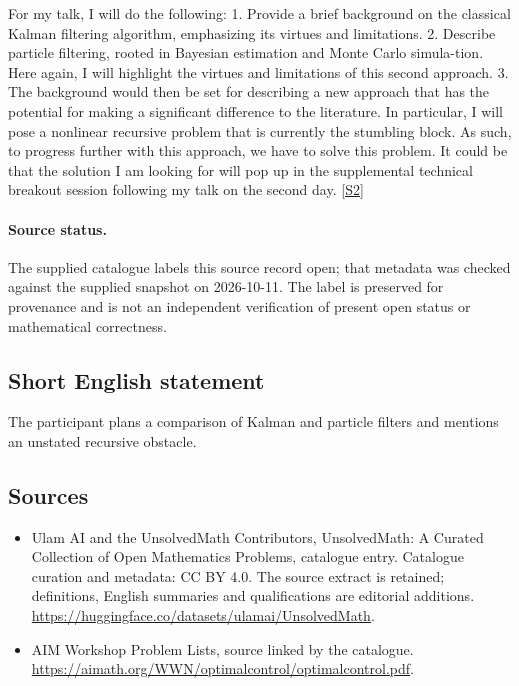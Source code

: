 \documentclass[11pt]{article}
\newcommand{\sref}[2]{\hyperlink{source:#1:#2}{[S#2]}}
\begin{document}
For my talk, I will do the following: 1. Provide a brief background on the classical Kalman filtering algorithm, emphasizing its virtues and limitations. 2. Describe particle filtering, rooted in Bayesian estimation and Monte Carlo simula-tion. Here again, I will highlight the virtues and limitations of this second approach. 3. The background would then be set for describing a new approach that has the potential for making a significant difference to the literature. In particular, I will pose a nonlinear recursive problem that is currently the stumbling block. As such, to progress further with this approach, we have to solve this problem. It could be that the solution I am looking for will pop up in the supplemental technical breakout session following my talk on the second day. \sref{statement}{2}
\paragraph{Source status.}
The supplied catalogue labels this source record open; that metadata was checked against the supplied snapshot on 2026-10-11. The label is preserved for provenance and is not an independent verification of present open status or mathematical correctness.
\subsection{Short English statement}
The participant plans a comparison of Kalman and particle filters and mentions an unstated recursive obstacle.
\subsection{Sources}
\begin{itemize}
\item[\hypertarget{source:statement:1}{S1}] Ulam AI and the UnsolvedMath Contributors, UnsolvedMath: A Curated Collection of Open Mathematics Problems, catalogue entry. Catalogue curation and metadata: CC BY 4.0. The source extract is retained; definitions, English summaries and qualifications are editorial additions.
\url{https://huggingface.co/datasets/ulamai/UnsolvedMath}.
\item[\hypertarget{source:statement:2}{S2}] AIM Workshop Problem Lists, source linked by the catalogue.
\url{https://aimath.org/WWN/optimalcontrol/optimalcontrol.pdf}.
\end{itemize}
\end{document}
